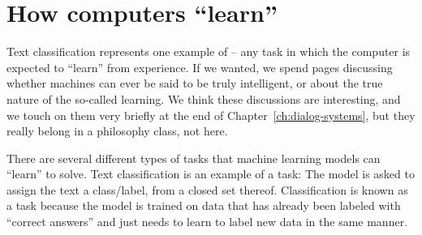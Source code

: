 
\section{How computers ``learn''}

Text classification represents one  example of  -- any task in which the  computer is expected
to ``learn'' from experience. 
If we wanted, we spend pages discussing whether machines can ever be said to be truly intelligent, 
or  about the true nature of the so-called learning. 
We think these discussions are interesting, and we touch on them very briefly at the end of Chapter~\ref{ch:dialog-systems},
but they really belong in a philosophy class, not here. 

There are several different types of tasks that machine learning models can ``learn'' to solve.  Text classification is an example of a  task: The model is asked to assign the text a class/label, from a closed set thereof.  Classification is known as a  task because the model is trained on data that has already been labeled with ``correct answers'' and just needs to learn to  label new data in the same manner. 


